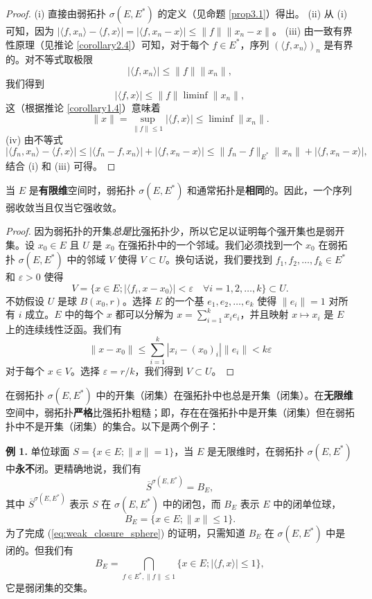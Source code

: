 \begin{proof}
(i) 直接由弱拓扑 $\sigma(E, E^*)$ 的定义（见命题 \ref{prop3.1}）得出。
(ii) 从 (i) 可知，因为 $|\langle f, x_n \rangle - \langle f, x \rangle| = |\langle f, x_n - x \rangle| \le \|f\| \|x_n - x\|$。
(iii) 由一致有界性原理（见推论 \ref{corollary2.4}）可知，对于每个 $f \in E^*$，序列 $(\langle f, x_n \rangle)_n$ 是有界的。对不等式取极限
\[ |\langle f, x_n \rangle| \le \|f\| \|x_n\|, \]
我们得到
\[ |\langle f, x \rangle| \le \|f\| \liminf \|x_n\|, \]
这（根据推论 \ref{corollary1.4}）意味着
\[ \|x\| = \sup_{\|f\| \le 1} |\langle f, x \rangle| \le \liminf \|x_n\|. \]
(iv) 由不等式
\[ |\langle f_n, x_n \rangle - \langle f, x \rangle| \le |\langle f_n - f, x_n \rangle| + |\langle f, x_n - x \rangle| \le \|f_n - f\|_{E^*} \|x_n\| + |\langle f, x_n - x \rangle|, \]
结合 (i) 和 (iii) 可得。
\end{proof}

\begin{proposition}\label{prop3.6}
当 $E$ 是\textbf{有限维}空间时，弱拓扑 $\sigma(E, E^*)$ 和通常拓扑是\textbf{相同}的。因此，一个序列弱收敛当且仅当它强收敛。
\end{proposition}

\begin{proof}
因为弱拓扑的开集\textit{总是}比强拓扑少，所以它足以证明每个强开集也是弱开集。设 $x_0 \in E$ 且 $U$ 是 $x_0$ 在强拓扑中的一个邻域。我们必须找到一个 $x_0$ 在弱拓扑 $\sigma(E, E^*)$ 中的邻域 $V$ 使得 $V \subset U$。换句话说，我们要找到 $f_1, f_2, \dots, f_k \in E^*$ 和 $\varepsilon > 0$ 使得
\[ V = \{x \in E; |\langle f_i, x - x_0 \rangle| < \varepsilon \quad \forall i = 1, 2, \dots, k\} \subset U. \]
不妨假设 $U$ 是球 $B(x_0, r)$。选择 $E$ 的一个基 $e_1, e_2, \dots, e_k$ 使得 $\|e_i\|=1$ 对所有 $i$ 成立。$E$ 中的每个 $x$ 都可以分解为 $x = \sum_{i=1}^k x_i e_i$，并且映射 $x \mapsto x_i$ 是 $E$ 上的连续线性泛函。我们有
\[ \|x - x_0\| \le \sum_{i=1}^k |x_i - (x_0)_i| \|e_i\| < k\varepsilon \]
对于每个 $x \in V$。选择 $\varepsilon = r/k$，我们得到 $V \subset U$。
\end{proof}

\begin{remark}\label{remark3.2}
在弱拓扑 $\sigma(E, E^*)$ 中的开集（闭集）在强拓扑中也总是开集（闭集）。在\textbf{无限维}空间中，弱拓扑\textbf{严格}比强拓扑粗糙；即，存在在强拓扑中是开集（闭集）但在弱拓扑中不是开集（闭集）的集合。以下是两个例子：
\end{remark}

\textbf{例 1.} 单位球面 $S = \{x \in E; \|x\| = 1\}$，当 $E$ 是无限维时，在弱拓扑 $\sigma(E, E^*)$ 中\textbf{永不}闭。更精确地说，我们有
\begin{equation}\label{eq:weak_closure_sphere}
\overline{S}^{\sigma(E, E^*)} = B_E,
\end{equation}
其中 $\overline{S}^{\sigma(E, E^*)}$ 表示 $S$ 在 $\sigma(E, E^*)$ 中的闭包，而 $B_E$ 表示 $E$ 中的闭单位球，
\[ B_E = \{x \in E; \|x\| \le 1\}. \]
为了完成 (\ref{eq:weak_closure_sphere}) 的证明，只需知道 $B_E$ 在 $\sigma(E, E^*)$ 中是闭的。但我们有
\[ B_E = \bigcap_{f \in E^*, \|f\| \le 1} \{x \in E; |\langle f, x \rangle| \le 1\}, \]
它是弱闭集的交集。

